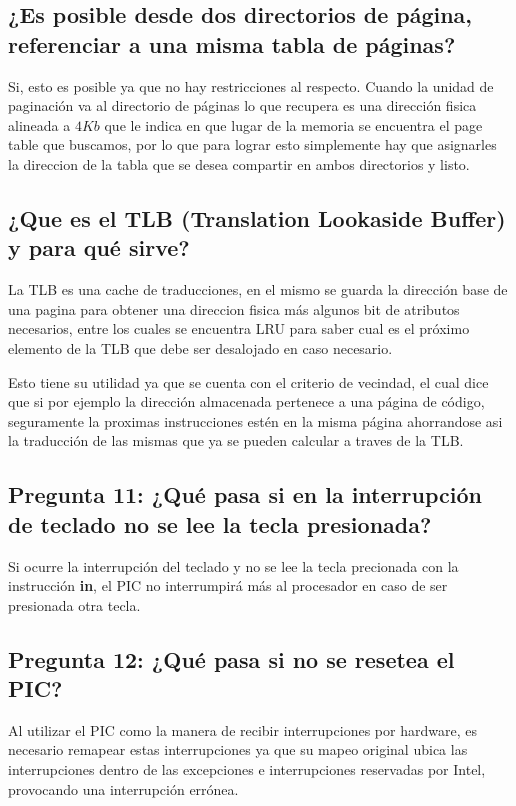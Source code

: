 \documentclass[a4paper,10pt,twoside]{article}
\begin{document}
\subsection{¿Es posible desde dos directorios de página, referenciar a una misma tabla de páginas?}
Si, esto es posible ya que no hay restricciones al respecto. Cuando la unidad de paginación va al directorio de páginas lo que recupera es una dirección fisica alineada a $4Kb$ que le indica en que lugar de la memoria se encuentra el page table que buscamos, por lo que para lograr esto simplemente hay que asignarles la direccion de la tabla que se desea compartir en ambos directorios y listo.

\subsection{¿Que es el TLB (Translation Lookaside Buffer) y para qué sirve?}

La TLB es una cache de traducciones, en el mismo se guarda la dirección base de una pagina para obtener una direccion fisica más algunos bit de atributos necesarios, entre los cuales se encuentra LRU para saber cual es el próximo elemento de la TLB que debe ser desalojado en caso necesario.

Esto tiene su utilidad ya que se cuenta con el criterio de vecindad, el cual dice que si por ejemplo la dirección almacenada pertenece a una página de código, seguramente la proximas instrucciones estén en la misma página ahorrandose asi la traducción de las mismas que ya se pueden calcular a traves de la TLB. 


\subsection{Pregunta 11: ¿Qué pasa si en la interrupción de teclado no se lee la tecla presionada?}
Si ocurre la interrupción del teclado y no se lee la tecla precionada con la instrucción \textbf{in}, el PIC no interrumpirá más al procesador en caso de ser presionada otra tecla.

\subsection{Pregunta 12: ¿Qué pasa si no se resetea el PIC?}
Al utilizar el PIC como la manera de recibir interrupciones por hardware, es necesario remapear estas interrupciones ya que su mapeo original ubica las interrupciones dentro de las excepciones e interrupciones reservadas por Intel, provocando una interrupción errónea.
\end{document}
